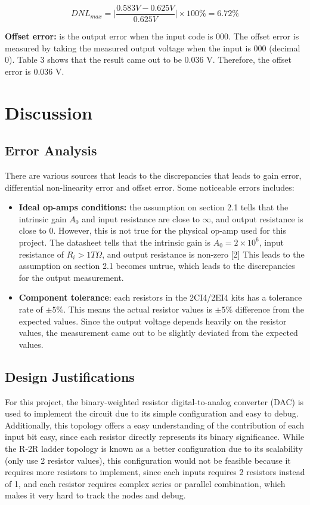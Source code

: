\documentclass[12pt]{article}
\begin{document}
    \[DNL_{max}=\Bigg|\frac{0.583V-0.625V}{0.625V}\Bigg| \times 100\%=\boxed{6.72\%}\]

    \textbf{Offset error:} is the output error when the input code is 000. The offset error is measured by taking the measured output voltage when the input is 000 (decimal 0). Table 3 shows that the result came out to be 0.036 V. Therefore, the offset error is 0.036 V. 
    \newpage
    \section{Discussion}
    

    \subsection{Error Analysis}

    There are various sources that leads to the discrepancies that leads to gain error, differential non-linearity error and offset error. Some noticeable errors includes:

    \begin{itemize}
        \item \textbf{Ideal op-amps conditions:} the assumption on section 2.1 tells that the intrinsic gain \(A_0\) and input resistance are close to \(\infty\), and output resistance is close to 0. However, this is not true for the physical op-amp used for this project. The datasheet tells that the intrinsic gain is \(A_0=2 \times 10^6\), input resistance of \(R_i>1T\Omega\), and output resistance is non-zero [2] This leads to the assumption on section 2.1 becomes untrue, which leads to the discrepancies for the output measurement. 

        \item \textbf{Component tolerance}: each resistors in the 2CI4/2EI4 kits has a tolerance rate of \(\pm 5\%\). This means the actual resistor values is \(\pm 5\%\) difference from the expected values. Since the output voltage depends heavily on the resistor values, the measurement came out to be slightly deviated from the expected values. 
    \end{itemize}

    \subsection{Design Justifications}

    For this project, the binary-weighted resistor digital-to-analog converter (DAC) is used to implement the circuit due to its simple configuration and easy to debug. Additionally, this topology offers a easy understanding of the contribution of each input bit easy, since each resistor directly represents its binary significance. While the R-2R ladder topology is known as a better configuration due to its scalability (only use 2 resistor values), this configuration would not be feasible because it requires more resistors to implement, since each inputs requires 2 resistors instead of 1, and each resistor requires complex series or parallel combination, which makes it very hard to track the nodes and debug. 
\end{document}
